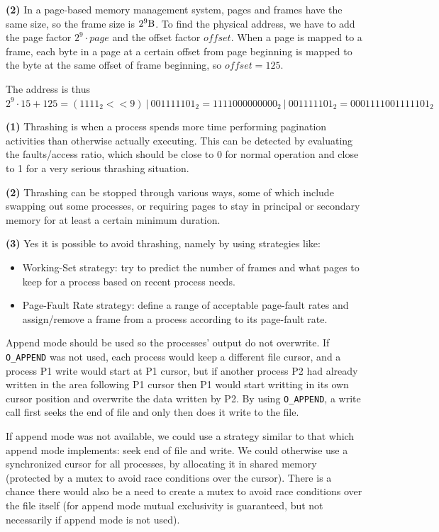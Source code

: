 \documentclass{sope}
\begin{document}
\textbf{(2)} In a page-based memory management system, pages and frames have the same size, so the frame size is $2^9\SI{}{\byte}$. To find the physical address, we have to add the page factor $2^9 \cdot page$ and the offset factor $offset$. When a page is mapped to a frame, each byte in a page at a certain offset from page beginning is mapped to the byte at the same offset of frame beginning, so $offset=125$.

The address is thus $2^9 \cdot 15 + 125 = (1111_2 << 9)~|~001111101_2 = 1111000000000_2~|~001111101_2 = 0001111001111101_2 $

\textbf{(1)} Thrashing is when a process spends more time performing pagination activities than otherwise actually executing. This can be detected by evaluating the faults/access ratio, which should be close to 0 for normal operation and close to 1 for a very serious thrashing situation.

\textbf{(2)} Thrashing can be stopped through various ways, some of which include swapping out some processes, or requiring pages to stay in principal or secondary memory for at least a certain minimum duration.

\textbf{(3)} Yes it is possible to avoid thrashing, namely by using strategies like:
\begin{itemize}
    \item Working-Set strategy: try to predict the number of frames and what pages to keep for a process based on recent process needs.
    \item Page-Fault Rate strategy: define a range of acceptable page-fault rates and assign/remove a frame from a process according to its page-fault rate.
\end{itemize}

Append mode should be used so the processes' output do not overwrite. If \texttt{O\_APPEND} was not used, each process would keep a different file cursor, and a process P1 write would start at P1 cursor, but if another process P2 had already written in the area following P1 cursor then P1 would start writting in its own cursor position and overwrite the data written by P2. By using \texttt{O\_APPEND}, a write call first seeks the end of file and only then does it write to the file.

If append mode was not available, we could use a strategy similar to that which append mode implements: seek end of file and write. We could otherwise use a synchronized cursor for all processes, by allocating it in shared memory (protected by a mutex to avoid race conditions over the cursor). There is a chance there would also be a need to create a mutex to avoid race conditions over the file itself (for append mode mutual exclusivity is guaranteed, but not necessarily if append mode is not used).
\end{document}
